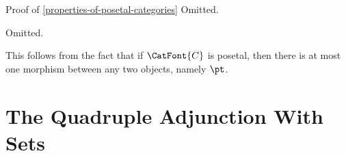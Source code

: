 \begin{Proof}{Proof of \cref{properties-of-posetal-categories}}
    Omitted.

    Omitted.

    This follows from the fact that if $\CatFont{C}$ is posetal, then there is at most one morphism between any two objects, namely $\pt$.
\end{Proof}
\section{The Quadruple Adjunction With Sets}\label{section-the-quadruple-adjunction-with-sets}
